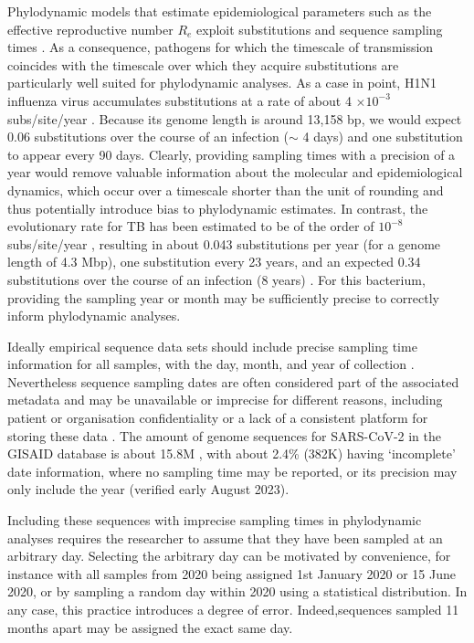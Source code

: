 \documentclass{article}
\begin{document}
\begin{spacing}{1.5}
Phylodynamic models that estimate epidemiological parameters such as the effective reproductive number $R_e$ exploit substitutions and sequence sampling times \citep{featherstone_decoding_2023}. As a consequence, pathogens for which the timescale of transmission coincides with the timescale over which they acquire substitutions are particularly well suited for phylodynamic analyses. As a case in point, H1N1 influenza virus accumulates substitutions at a rate of about 4 $\times10^{-3}$ subs/site/year \citep{hedge_2013_real-time}. Because its genome length is around 13,158 bp, we would expect 0.06 substitutions over the course of an infection ($\sim$ 4 days) and one substitution to appear every 90 days. Clearly, providing sampling times with a precision of a year would remove valuable information about the molecular and epidemiological dynamics, which occur over a timescale shorter than the unit of rounding and thus potentially introduce bias to phylodynamic estimates. In contrast, the evolutionary rate for TB has been estimated to be of the order of $10^{-8}$ subs/site/year \citep{menardo2019molecular}, resulting in about 0.043 substitutions per year (for a genome length of 4.3 Mbp), one substitution every 23 years, and an expected 0.34 substitutions over the course of an infection (8 years) \citep{kuhnert_tuberculosis_2018}. For this bacterium, providing the sampling year or month may be sufficiently precise to correctly inform phylodynamic analyses.

Ideally empirical sequence data sets should include precise sampling time information for all samples, with the day, month, and year of collection \citep{black2020ten}. Nevertheless sequence sampling dates are often considered part of the associated metadata and may be unavailable or imprecise for different reasons, including patient or organisation confidentiality or a lack of a consistent platform for storing these data \citep{raza2016big}. The amount of genome sequences for SARS-CoV-2 in the GISAID database is about 15.8M \citep{shu2017gisaid}, with about 2.4\% (382K) having `incomplete' date information, where no sampling time may be reported, or its precision may only include the year (verified early August 2023). 

Including these sequences with imprecise sampling times in phylodynamic analyses requires the researcher to assume that they have been sampled at an arbitrary day. Selecting the arbitrary day can be motivated by convenience, for instance with all samples from 2020 being assigned 1st January 2020 or 15 June 2020, or by sampling a random day within 2020 using a statistical distribution. In any case, this practice introduces a degree of error. Indeed,sequences sampled 11 months apart may be assigned the exact same day. 


\end{spacing}
\end{document}
